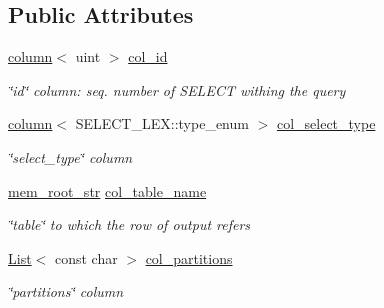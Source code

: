 \subsection*{Public Attributes}
\begin{DoxyCompactItemize}
\item 
\mbox{\label{classqep__row_a7493ff05543a88d1591b3c005729324d}} 
\mbox{\hyperlink{structqep__row_1_1column}{column}}$<$ uint $>$ \mbox{\hyperlink{classqep__row_a7493ff05543a88d1591b3c005729324d}{col\+\_\+id}}
\begin{DoxyCompactList}\small\item\em \char`\"{}id\char`\"{} column\+: seq. number of S\+E\+L\+E\+CT withing the query \end{DoxyCompactList}\item 
\mbox{\label{classqep__row_a8bd9ccf9cf7dd2070c856f7b64b9da86}} 
\mbox{\hyperlink{structqep__row_1_1column}{column}}$<$ S\+E\+L\+E\+C\+T\+\_\+\+L\+E\+X\+::type\+\_\+enum $>$ \mbox{\hyperlink{classqep__row_a8bd9ccf9cf7dd2070c856f7b64b9da86}{col\+\_\+select\+\_\+type}}
\begin{DoxyCompactList}\small\item\em \char`\"{}select\+\_\+type\char`\"{} column \end{DoxyCompactList}\item 
\mbox{\label{classqep__row_ac9507c369c17ea177cad02a4c3193819}} 
\mbox{\hyperlink{structqep__row_1_1mem__root__str}{mem\+\_\+root\+\_\+str}} \mbox{\hyperlink{classqep__row_ac9507c369c17ea177cad02a4c3193819}{col\+\_\+table\+\_\+name}}
\begin{DoxyCompactList}\small\item\em \char`\"{}table\char`\"{} to which the row of output refers \end{DoxyCompactList}\item 
\mbox{\label{classqep__row_a0854777f1d44321264594f54b5a85706}} 
\mbox{\hyperlink{classList}{List}}$<$ const char $>$ \mbox{\hyperlink{classqep__row_a0854777f1d44321264594f54b5a85706}{col\+\_\+partitions}}
\begin{DoxyCompactList}\small\item\em \char`\"{}partitions\char`\"{} column \end{DoxyCompactList}\item 
\mbox{\label{classqep__row_a3b10c9f93de3ed8d2c0ddfae96780fd0}} 

\end{DoxyCompactItemize}
